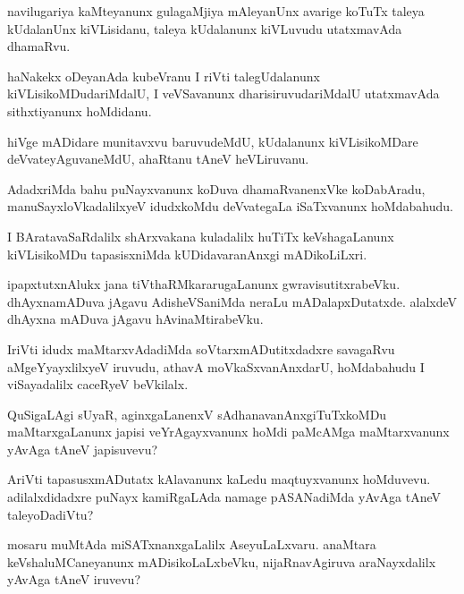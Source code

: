 \documentclass{article}
\begin{document}
\begin{mn}
navilugariya kaMteyanunx gulagaMjiya mAleyanUnx avarige koTuTx taleya
kUdalanUnx kiVLisidanu, taleya kUdalanunx kiVLuvudu utatxmavAda dhamaRvu.
\end{mn}

\begin{mn}
haNakekx oDeyanAda kubeVranu I riVti talegUdalanunx
kiVLisikoMDudariMdalU, I veVSavanunx dharisiruvudariMdalU utatxmavAda
sithxtiyanunx hoMdidanu.
\end{mn}

\begin{mn}%
hiVge mADidare munitavxvu baruvudeMdU, kUdalanunx kiVLisikoMDare
deVvateyAguvaneMdU, ahaRtanu tAneV heVLiruvanu.
\end{mn}

\begin{mn}
AdadxriMda bahu puNayxvanunx koDuva dhamaRvanenxVke koDabAradu,
manuSayxloVkadalilxyeV idudxkoMdu deVvategaLa iSaTxvanunx hoMdabahudu.
\end{mn}

\begin{mn}
I BAratavaSaRdalilx shArxvakana kuladalilx huTiTx keVshagaLanunx
kiVLisikoMDu tapasisxniMda kUDidavaranAnxgi mADikoLiLxri.
\end{mn}

\begin{mn}
ipapxtutxnAlukx jana tiVthaRMkararugaLanunx
gwravisutitxrabeVku. dhAyxnamADuva jAgavu AdisheVSaniMda neraLu
mADalapxDutatxde. alalxdeV dhAyxna mADuva jAgavu hAvinaMtirabeVku.
\end{mn}

\begin{mn}
IriVti idudx maMtarxvAdadiMda soVtarxmADutitxdadxre savagaRvu
aMgeYyayxlilxyeV iruvudu, athavA moVkaSxvanAnxdarU, hoMdabahudu I
viSayadalilx caceRyeV beVkilalx.
\end{mn}

\begin{mn}%
QuSigaLAgi sUyaR, aginxgaLanenxV sAdhanavanAnxgiTuTxkoMDu
maMtarxgaLanunx japisi veYrAgayxvanunx hoMdi paMcAMga maMtarxvanunx
yAvAga tAneV japisuvevu?
\end{mn}

\begin{mn}
AriVti tapasusxmADutatx kAlavanunx kaLedu maqtuyxvanunx
hoMduvevu. adilalxdidadxre puNayx kamiRgaLAda namage pASANadiMda
yAvAga tAneV taleyoDadiVtu?
\end{mn}

\begin{mn}
mosaru muMtAda miSATxnanxgaLalilx AseyuLaLxvaru. anaMtara
keVshaluMCaneyanunx mADisikoLaLxbeVku, nijaRnavAgiruva araNayxdalilx
yAvAga tAneV iruvevu?
\end{mn}
\end{document}

